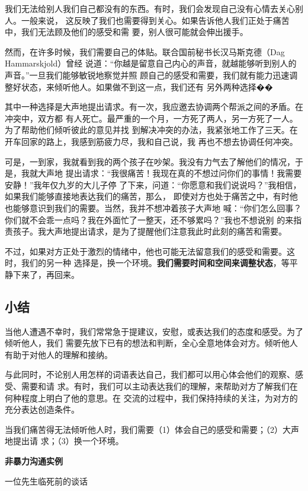 \documentclass{ctexart}
\begin{document}
我们无法给别人我们自己都没有的东西。有时，我们会发现自己没有心情去关心别人。一般来说，
这反映了我们也需要得到关心。如果告诉他人我们正处于痛苦中，我们无法顾及他们的感受和需
要，别人很可能就会伸出援手。

然而，在许多时候，我们需要自己的体贴。联合国前秘书长汉马斯克德（Dag Hammarskjold）曾经
说道：``你越是留意自己内心的声音，就越能够听到别人的声音。''一旦我们能够敏锐地察觉并照
顾自己的感受和需要，我们就有能力迅速调整好状态，来倾听他人。如果做不到这一点，我们还有
另外两种选择��

其中一种选择是大声地提出请求。有一次，我应邀去协调两个帮派之间的矛盾。在冲突中，双方都
有人死亡。最严重的一个月，一方死了两人，另一方死了一人。为了帮助他们倾听彼此的意见并找
到解决冲突的办法，我紧张地工作了三天。在开车回家的路上，我感到筋疲力尽，我和自己说，我
再也不想去协调任何冲突。

可是，一到家，我就看到我的两个孩子在吵架。我没有力气去了解他们的情况，于是，我就大声地
提出请求：``我很痛苦！我现在真的不想过问你们的事情！我需要安静！''我年仅九岁的大儿子停
了下来，问道：``你愿意和我们说说吗？''我相信，如果我们能够直接地表达我们的痛苦，那么，
即使对方也处于痛苦之中，有时他也能够意识到我们的需要。当然，我并不想冲着孩子大声地
喊：``你们怎么回事？你们就不会乖一点吗？我在外面忙了一整天，还不够累吗？''我也不想说别
的来指责孩子。我大声地提出请求，是为了提醒他们注意我此时此刻的痛苦和需要。

不过，如果对方正处于激烈的情绪中，他也可能无法留意我们的感受和需要。这时，我们的另一种
选择是，换一个环境。\textbf{我们需要时间和空间来调整状态}，等平静下来了，再回来。

\subsection{小结}

当他人遭遇不幸时，我们常常急于提建议，安慰，或表达我们的态度和感受。为了倾听他人，我们
需要先放下已有的想法和判断，全心全意地体会对方。倾听他人有助于对他人的理解和接纳。

与此同时，不论别人用怎样的词语表达自己，我们都可以用心体会他们的观察、感受、需要和请
求。有时，我们可以主动表达我们的理解，来帮助对方了解我们在何种程度上明白了他的意思。在
交流的过程中，我们保持持续的关注，为对方的充分表达创造条件。

当我们痛苦得无法倾听他人时，我们需要（1）体会自己的感受和需要；（2）大声地提出请
求；（3）换一个环境。

\textbf{非暴力沟通实例}

一位先生临死前的谈话
\end{document}
